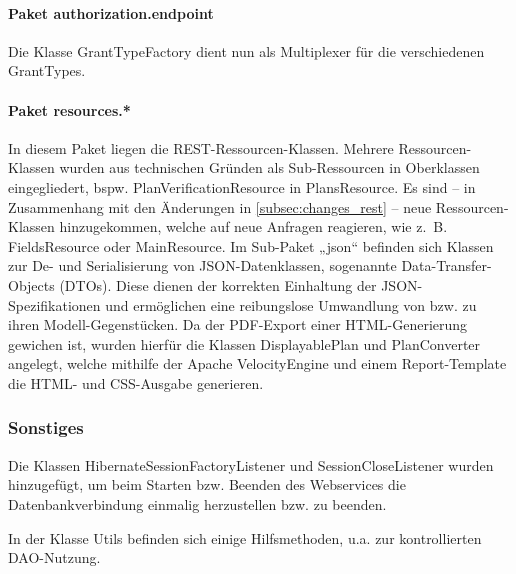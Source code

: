 \paragraph{Paket authorization.endpoint} Die Klasse GrantTypeFactory dient nun als Multiplexer für die verschiedenen GrantTypes.


\paragraph{Paket resources.*} In diesem Paket liegen die REST-Ressourcen-Klassen. Mehrere Ressourcen-Klassen wurden aus technischen Gründen als Sub-Ressourcen in Oberklassen eingegliedert, bspw. PlanVerificationResource in PlansResource. Es sind -- in Zusammenhang mit den Änderungen in \ref{subsec:changes_rest} -- neue Ressourcen-Klassen hinzugekommen, welche auf neue Anfragen reagieren, wie z.~B. FieldsResource oder MainResource. \newline
Im Sub-Paket „json“ befinden sich Klassen zur De- und Serialisierung von JSON-Datenklassen, sogenannte Data-Transfer-Objects (DTOs). Diese dienen der korrekten Einhaltung der JSON-Spezifikationen und ermöglichen eine reibungslose Umwandlung von bzw. zu ihren Modell-Gegenstücken. \newline
Da der PDF-Export einer HTML-Generierung gewichen ist, wurden hierfür die Klassen DisplayablePlan und PlanConverter angelegt, welche mithilfe der Apache VelocityEngine und einem Report-Template die HTML- und CSS-Ausgabe generieren.



\subsubsection{Sonstiges}

Die Klassen HibernateSessionFactoryListener und SessionCloseListener wurden hinzugefügt, um beim Starten bzw. Beenden des Webservices die Datenbankverbindung einmalig herzustellen bzw. zu beenden.

In der Klasse Utils befinden sich einige Hilfsmethoden, u.a. zur kontrollierten DAO-Nutzung.